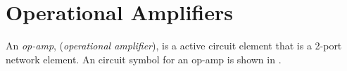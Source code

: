 \section{Operational Amplifiers}\label{sec:Op-Amps}
\begin{definition}[Op-Amp]\label{def:Op-Amp}
  An \emph{op-amp}, (\emph{operational amplifier}), is a active circuit element that is a 2-port network element.
  An circuit symbol for an op-amp is shown in .
\end{definition}


